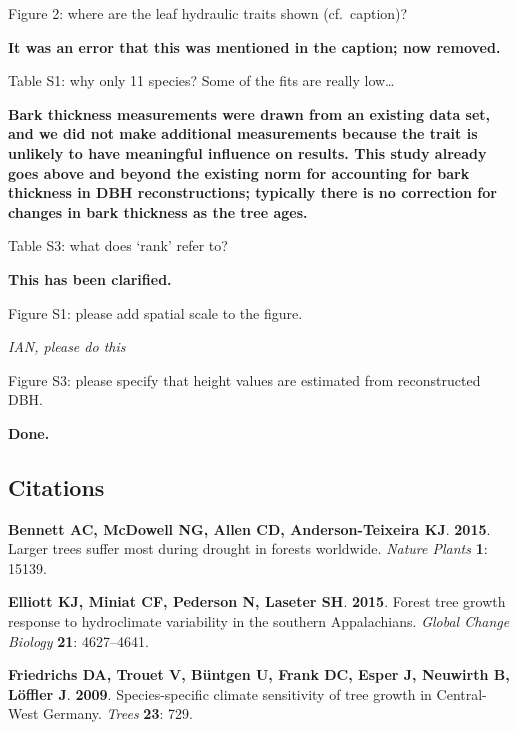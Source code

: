 \documentclass[
]{article}
\begin{document}
Figure 2: where are the leaf hydraulic traits shown (cf.~caption)?

\textbf{It was an error that this was mentioned in the caption; now
removed.}

Table S1: why only 11 species? Some of the fits are really low\ldots{}

\textbf{Bark thickness measurements were drawn from an existing data
set, and we did not make additional measurements because the trait is
unlikely to have meaningful influence on results. This study already
goes above and beyond the existing norm for accounting for bark
thickness in DBH reconstructions; typically there is no correction for
changes in bark thickness as the tree ages.}

Table S3: what does `rank' refer to?

\textbf{This has been clarified.}

Figure S1: please add spatial scale to the figure.

\emph{IAN, please do this}

Figure S3: please specify that height values are estimated from
reconstructed DBH.

\textbf{Done.}

\hypertarget{citations}{%
\subsection*{Citations}\label{citations}}

\hypertarget{refs}{}
\leavevmode\hypertarget{ref-bennett_larger_2015}{}%
\textbf{\textnormal{Bennett AC}, \textnormal{McDowell NG},
\textnormal{Allen CD}, \textnormal{Anderson-Teixeira KJ}}.
\textbf{2015}. Larger trees suffer most during drought in forests
worldwide. \emph{Nature Plants} \textbf{1}: 15139.

\leavevmode\hypertarget{ref-elliott_forest_2015}{}%
\textbf{\textnormal{Elliott KJ}, \textnormal{Miniat CF},
\textnormal{Pederson N}, \textnormal{Laseter SH}}. \textbf{2015}. Forest
tree growth response to hydroclimate variability in the southern
Appalachians. \emph{Global Change Biology} \textbf{21}: 4627--4641.

\leavevmode\hypertarget{ref-friedrichs_species-specific_2009}{}%
\textbf{\textnormal{Friedrichs DA}, \textnormal{Trouet V},
\textnormal{Büntgen U}, \textnormal{Frank DC}, \textnormal{Esper J},
\textnormal{Neuwirth B}, \textnormal{Löffler J}}. \textbf{2009}.
Species-specific climate sensitivity of tree growth in Central-West
Germany. \emph{Trees} \textbf{23}: 729.
\end{document}
